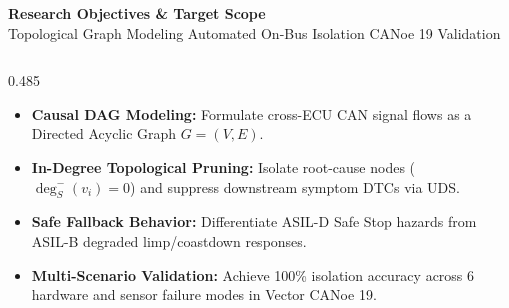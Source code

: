 \documentclass[aspectratio=169,10pt]{beamer}
\newcommand{\slidetitle}[2]{%
  \vspace{0.08cm}
  {\Large\bfseries\color{vectorred}#1}\\[2pt]
  {\footnotesize\color{slategrey}#2}
  \vspace{0.10cm}
}
\begin{document}
\begin{frame}[t]
\slidetitle{Research Objectives \& Target Scope}{Topological Graph Modeling \textbullet{} Automated On-Bus Isolation \textbullet{} CANoe 19 Validation}

\begin{columns}[T,totalwidth=\textwidth]

  \begin{column}{0.485\textwidth}
    \begin{tcolorbox}[cardstyle, colframe=accentblue!75, colbacktitle=accentblue!8, height=5.95cm,
      title={\normalsize\bfseries\color{accentblue} Primary Research Objectives}]
      \footnotesize\color{slatedark}\raggedright
      \vspace{2pt}
      \begin{itemize}\setlength{\itemsep}{6pt}\setlength{\leftmargini}{10pt}
        \item \textbf{Causal DAG Modeling:} Formulate cross-ECU CAN signal flows as a Directed Acyclic Graph $G=(V, E)$.
        \item \textbf{In-Degree Topological Pruning:} Isolate root-cause nodes ($\deg_S^-(v_i)=0$) and suppress downstream symptom DTCs via UDS.
        \item \textbf{Safe Fallback Behavior:} Differentiate ASIL-D Safe Stop hazards from ASIL-B degraded limp/coastdown responses.
        \item \textbf{Multi-Scenario Validation:} Achieve 100\% isolation accuracy across 6 hardware and sensor failure modes in Vector CANoe 19.
      \end{itemize}
    \end{tcolorbox}
  \end{column}


\end{columns}
\end{frame}
\end{document}
